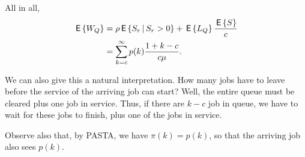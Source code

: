 \begin{exercise}
\begin{solution}
All in all,
\begin{equation*}
  \begin{split}
  \,\mathsf{E}\left\{W_Q\right\} 
&= \rho\,\mathsf{E}\left\{S_r\,\middle|\, S_r>0\right\}  +   \,\mathsf{E}\left\{L_Q\right\}\frac{\,\mathsf{E}\left\{S\right\}}c \\
&= \sum_{k=c}^\infty p(k)\frac{1+k-c}{c\mu}.
  \end{split}
\end{equation*}

We can also give this a natural interpretation. How many jobs have to
leave before the service of the arriving job can start? Well, the
entire queue must be cleared plus one job in service. Thus, if there
are $k-c$ job in queue, we have to wait for these jobs to finish, plus
one of the jobs in service. 

Observe also that, by PASTA, we have $\pi(k) = p(k)$, so that the
arriving job also sees $p(k)$.
  \end{solution}
\end{exercise}


